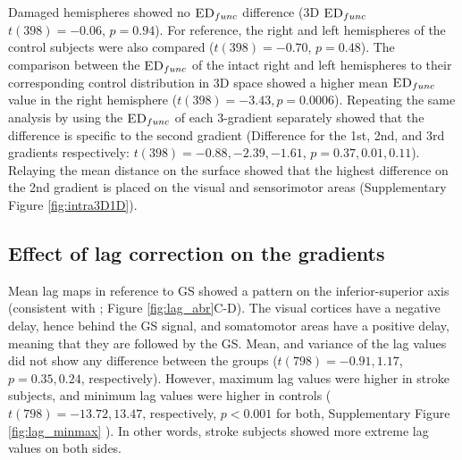 \documentclass[fleqn,10pt]{wlscirep}
\begin{document}
Damaged hemispheres showed no $\textsc{ED}_{{func}}$ difference (3D $\textsc{ED}_{{func}}$ $t(398) = -0.06$, $p=0.94$). For reference, the right and left hemispheres of the control subjects were also compared ($t(398) = -0.70$, $p = 0.48$). The comparison between the $\textsc{ED}_{{func}}$ of the intact right and left hemispheres to their corresponding control distribution in 3D space showed a higher mean $\textsc{ED}_{{func}}$ value in the right hemisphere ($t(398)=-3.43, p=0.0006$). Repeating the same analysis by using the $\textsc{ED}_{{func}}$ of each 3-gradient separately showed that the difference is specific to the second gradient (Difference for the 1st, 2nd, and 3rd gradients respectively: $t(398) = -0.88, -2.39, -1.61$, $p = 0.37, 0.01, 0.11$). Relaying the mean distance on the surface showed that the highest difference on the 2nd gradient is placed on the visual and sensorimotor areas (Supplementary Figure \ref{fig:intra3D1D}).  

\subsection*{Effect of lag correction on the gradients}
Mean lag maps in reference to GS showed a pattern on the inferior-superior axis (consistent with \citet{tong2019low,erdougan2016correcting}; Figure \ref{fig:lag_abr}C-D). The visual cortices have a negative delay, hence behind the GS signal, and somatomotor areas have a positive delay, meaning that they are followed by the GS. Mean, and variance of the lag values did not show any difference between the groups ($t(798) = -0.91, 1.17$, $p = 0.35, 0.24$, respectively). However, maximum lag values were higher in stroke subjects, and minimum lag values were higher in controls ($t(798) = -13.72, 13.47$, respectively,  $p < 0.001$ for both, Supplementary Figure \ref{fig:lag_minmax} ). In other words, stroke subjects showed more extreme lag values on both sides. 
\end{document}
